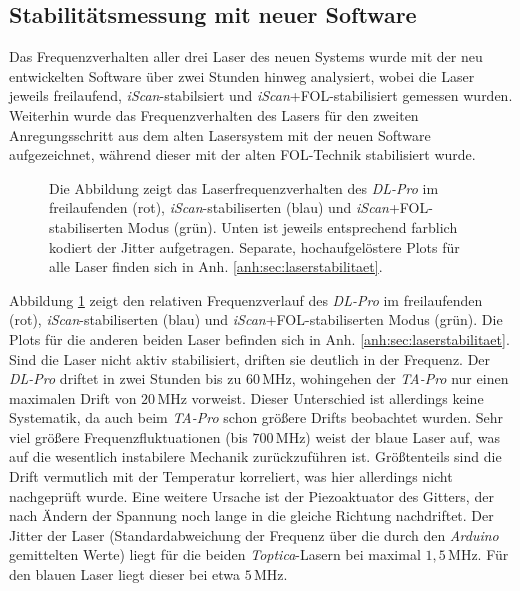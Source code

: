 \subsection{Stabilitätsmessung mit neuer Software}
Das Frequenzverhalten aller drei Laser des neuen Systems wurde mit der neu
entwickelten Software über zwei Stunden hinweg analysiert, wobei die
Laser jeweils freilaufend, \textit{iScan}-stabilsiert und
\textit{iScan}+FOL-stabilisiert gemessen wurden. Weiterhin wurde das
Frequenzverhalten des Lasers für den zweiten Anregungsschritt aus dem alten Lasersystem mit der neuen Software aufgezeichnet,
während dieser mit der alten FOL-Technik stabilisiert wurde.\par
\begin{figure}[h]
 	\centering
 	\footnotesize
	
	\caption[Laserfrequenzverhalten \textit{DL-Pro}]{Die Abbildung zeigt das
	Laserfrequenzverhalten des \textit{DL-Pro} im freilaufenden (rot),
	\textit{iScan}-stabiliserten (blau) und \textit{iScan}+FOL-stabiliserten Modus
	(grün).
	Unten ist jeweils entsprechend farblich kodiert der Jitter aufgetragen.
	Separate, hochaufgelöstere Plots für alle Laser finden sich in Anh.
	\ref{anh:sec:laserstabilitaet}.}
	\label{fig:laserstabilitaet_b_alles}
\end{figure}
Abbildung \ref{fig:laserstabilitaet_b_alles} zeigt den relativen
Frequenzverlauf des \textit{DL-Pro} im freilaufenden (rot),
\textit{iScan}-stabiliserten (blau) und \textit{iScan}+FOL-stabiliserten Modus
(grün). Die Plots für die anderen beiden Laser befinden sich in Anh.
\ref{anh:sec:laserstabilitaet}. Sind die Laser nicht aktiv stabilisiert, driften
sie deutlich in der Frequenz. Der \textit{DL-Pro} driftet in zwei Stunden bis zu $60\,$MHz, wohingehen der
\textit{TA-Pro} nur einen maximalen Drift von $20\,$MHz vorweist. Dieser
Unterschied ist allerdings keine Systematik, da auch beim \textit{TA-Pro} schon
größere Drifts beobachtet wurden. Sehr viel größere Frequenzfluktuationen (bis $700\,$MHz)
weist der blaue Laser auf, was auf die wesentlich instabilere Mechanik
zurückzuführen ist. Größtenteils sind die Drift vermutlich mit der Temperatur
korreliert, was hier allerdings nicht nachgeprüft wurde. Eine weitere Ursache
ist der Piezoaktuator des Gitters, der nach Ändern der Spannung noch lange in
die gleiche Richtung nachdriftet. Der Jitter der Laser (Standardabweichung der
Frequenz über die durch den \textit{Arduino} gemittelten Werte) liegt für die
beiden \textit{Toptica}-Lasern bei maximal $1,5\,$MHz. Für den blauen Laser
liegt dieser bei etwa $5\,$MHz.\par

